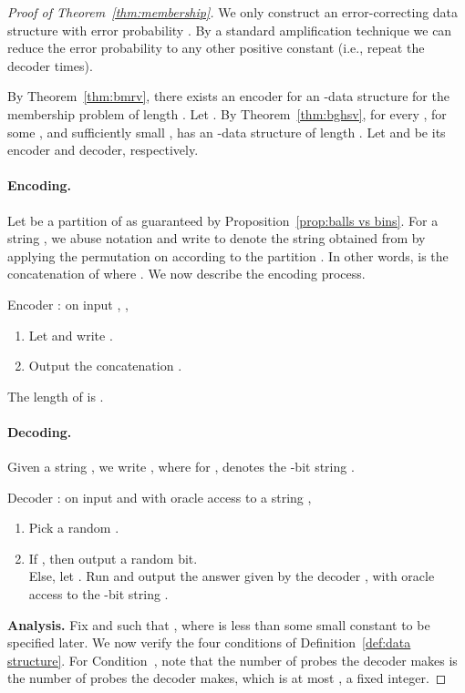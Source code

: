 \documentclass[11pt,english]{article}
\theoremstyle{definition}
\theoremstyle{remark}
\begin{document}
\begin{proof}[Proof of Theorem~\ref{thm:membership}]We only construct
an error-correcting data structure with error probability .
By a standard amplification technique 
we can reduce the error probability to any other positive constant (i.e., repeat the decoder  times).

By Theorem~\ref{thm:bmrv}, there exists an encoder 
for an -data structure for the membership problem
 of length . Let .
By Theorem~\ref{thm:bghsv}, for every , for some ,
and sufficiently small ,  has an -data structure of length . Let 
and  be its encoder and decoder, respectively.


\paragraph{\textbf{Encoding.}}

Let  be a partition of  as guaranteed by
Proposition~\ref{prop:balls vs bins}. For a string ,
we abuse notation and write  to denote
the string obtained from  by applying the permutation on 
according to the partition . In other words,
 is the concatenation of  where .
We now describe the encoding process.

Encoder : on input , , 
\begin{enumerate}
\item Let  and write . 
\item Output the concatenation . 
\end{enumerate}
The length of  is .

\paragraph{\textbf{Decoding.}}

Given a string , we write ,
where for ,  denotes the -bit string .

Decoder : on input  and with oracle access to a string , 
\begin{enumerate}
\item Pick a random . 
\item If , then output a random bit. \\
 Else, let . Run and output the answer
given by the decoder , with oracle access to the -bit
string . 
\end{enumerate}
\textbf{Analysis.} Fix  and  such that ,
where  is less than some small constant  to be specified later.
We now verify the four conditions of Definition~\ref{def:data structure}.
For Condition~, note that the number of probes the decoder 
makes is the number of probes the decoder  makes, which
is at most , a fixed integer.


\end{proof}
\end{document}
